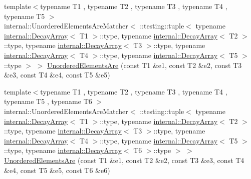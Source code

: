 \begin{DoxyCompactItemize}
\item 
{\footnotesize template$<$typename T1 , typename T2 , typename T3 , typename T4 , typename T5 $>$ }\\internal\+::\+Unordered\+Elements\+Are\+Matcher$<$ \+::testing\+::tuple$<$ typename \mbox{\hyperlink{structtesting_1_1internal_1_1DecayArray}{internal\+::\+Decay\+Array}}$<$ T1 $>$\+::type, typename \mbox{\hyperlink{structtesting_1_1internal_1_1DecayArray}{internal\+::\+Decay\+Array}}$<$ T2 $>$\+::type, typename \mbox{\hyperlink{structtesting_1_1internal_1_1DecayArray}{internal\+::\+Decay\+Array}}$<$ T3 $>$\+::type, typename \mbox{\hyperlink{structtesting_1_1internal_1_1DecayArray}{internal\+::\+Decay\+Array}}$<$ T4 $>$\+::type, typename \mbox{\hyperlink{structtesting_1_1internal_1_1DecayArray}{internal\+::\+Decay\+Array}}$<$ T5 $>$\+::type $>$ $>$ \mbox{\hyperlink{namespacetesting_a5e0ff76eb3f61b6c79b60311ceca73d3}{Unordered\+Elements\+Are}} (const T1 \&e1, const T2 \&e2, const T3 \&e3, const T4 \&e4, const T5 \&e5)
\item 
{\footnotesize template$<$typename T1 , typename T2 , typename T3 , typename T4 , typename T5 , typename T6 $>$ }\\internal\+::\+Unordered\+Elements\+Are\+Matcher$<$ \+::testing\+::tuple$<$ typename \mbox{\hyperlink{structtesting_1_1internal_1_1DecayArray}{internal\+::\+Decay\+Array}}$<$ T1 $>$\+::type, typename \mbox{\hyperlink{structtesting_1_1internal_1_1DecayArray}{internal\+::\+Decay\+Array}}$<$ T2 $>$\+::type, typename \mbox{\hyperlink{structtesting_1_1internal_1_1DecayArray}{internal\+::\+Decay\+Array}}$<$ T3 $>$\+::type, typename \mbox{\hyperlink{structtesting_1_1internal_1_1DecayArray}{internal\+::\+Decay\+Array}}$<$ T4 $>$\+::type, typename \mbox{\hyperlink{structtesting_1_1internal_1_1DecayArray}{internal\+::\+Decay\+Array}}$<$ T5 $>$\+::type, typename \mbox{\hyperlink{structtesting_1_1internal_1_1DecayArray}{internal\+::\+Decay\+Array}}$<$ T6 $>$\+::type $>$ $>$ \mbox{\hyperlink{namespacetesting_aff1859501ecd94dd1bc428d146a66fdc}{Unordered\+Elements\+Are}} (const T1 \&e1, const T2 \&e2, const T3 \&e3, const T4 \&e4, const T5 \&e5, const T6 \&e6)
\item 

\end{DoxyCompactItemize}
